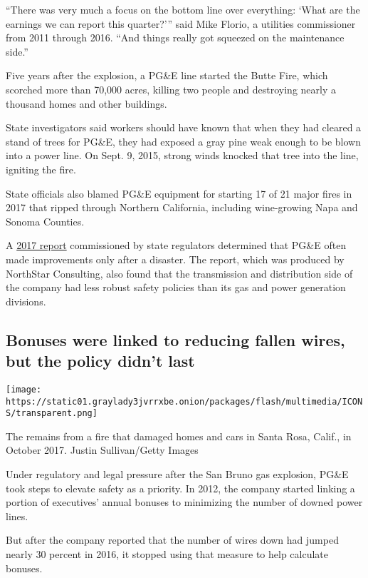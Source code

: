 ``There was very much a focus on the bottom line over everything: `What
are the earnings we can report this quarter?''' said Mike Florio, a
utilities commissioner from 2011 through 2016. ``And things really got
squeezed on the maintenance side.''

Five years after the explosion, a PG\&E line started the Butte Fire,
which scorched more than 70,000 acres, killing two people and destroying
nearly a thousand homes and other buildings.

State investigators said workers should have known that when they had
cleared a stand of trees for PG\&E, they had exposed a gray pine weak
enough to be blown into a power line. On Sept. 9, 2015, strong winds
knocked that tree into the line, igniting the fire.

State officials also blamed PG\&E equipment for starting 17 of 21 major
fires in 2017 that ripped through Northern California, including
wine-growing Napa and Sonoma Counties.

A
\href{http://docs.cpuc.ca.gov/PublishedDocs/Efile/G000/M235/K399/235399881.PDF}{2017
report} commissioned by state regulators determined that PG\&E often
made improvements only after a disaster. The report, which was produced
by NorthStar Consulting, also found that the transmission and
distribution side of the company had less robust safety policies than
its gas and power generation divisions.

\hypertarget{bonuses-were-linked-to-reducing-fallen-wires-but-the-policy-didnt-last}{%
\subsection{Bonuses were linked to reducing fallen wires, but the policy
didn't
last}\label{bonuses-were-linked-to-reducing-fallen-wires-but-the-policy-didnt-last}}

\texttt{[image: https://static01.graylady3jvrrxbe.onion/packages/flash/multimedia/ICONS/transparent.png]}

The remains from a fire that damaged homes and cars in Santa Rosa,
Calif., in October 2017. Justin Sullivan/Getty Images

Under regulatory and legal pressure after the San Bruno gas explosion,
PG\&E took steps to elevate safety as a priority. In 2012, the company
started linking a portion of executives' annual bonuses to minimizing
the number of downed power lines.

But after the company reported that the number of wires down had jumped
nearly 30 percent in 2016, it stopped using that measure to help
calculate bonuses.

